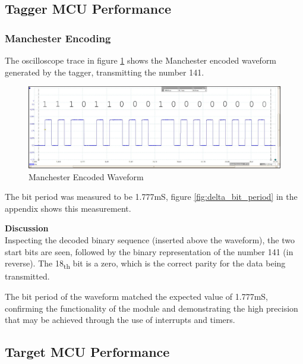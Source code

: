 


\subsection{Tagger MCU Performance}

\subsubsection{Manchester Encoding}
The oscilloscope trace in figure \ref{fig:manchester_sequence_141_decoded} shows the Manchester encoded waveform generated by the tagger, transmitting the number 141.

\begin{figure}[H]
	\centering
	\includegraphics[width=.9\textwidth]{figures/results/manchester/manchester_sequence_141_decoded.png}
	\caption{Manchester Encoded Waveform}
	\label{fig:manchester_sequence_141_decoded}
\end{figure}

The bit period was measured to be 1.777mS, figure \ref{fig:delta_bit_period} in the appendix shows this measurement.


\textbf{Discussion}\\
Inspecting the decoded binary sequence (inserted above the waveform), the two start bits are seen, followed by the binary representation of the number 141 (in reverse). The 18\textsubscript{th} bit is a zero, which is the correct parity for the data being transmitted.

The bit period of the waveform matched the expected value of 1.777mS, confirming the functionality of the module and demonstrating the high precision that may be achieved through the use of interrupts and timers.






\subsection{Target MCU Performance}

